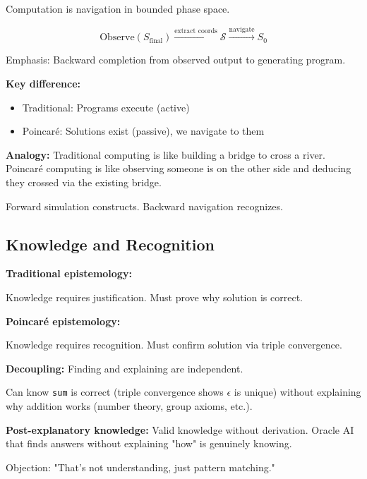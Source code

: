\documentclass[twocolumn,10pt]{article}
\theoremstyle{definition}
\theoremstyle{remark}
\newcommand{\Sspace}{\mathcal{S}}
\begin{document}
Computation is navigation in bounded phase space.

\begin{equation}
\text{Observe}(S_{\text{final}}) \xrightarrow{\text{extract coords}} \Sspace \xrightarrow{\text{navigate}} S_0
\end{equation}

Emphasis: Backward completion from observed output to generating program.

\vspace{0.2cm}
\noindent\textbf{Key difference:}
\begin{itemize}
\item Traditional: Programs execute (active)
\item Poincaré: Solutions exist (passive), we navigate to them
\end{itemize}

\textbf{Analogy:} Traditional computing is like building a bridge to cross a river. Poincaré computing is like observing someone is on the other side and deducing they crossed via the existing bridge.

Forward simulation constructs. Backward navigation recognizes.

\subsection{Knowledge and Recognition}

\textbf{Traditional epistemology\cite{quine1951}:}

Knowledge requires justification. Must prove why solution is correct.

\vspace{0.2cm}
\noindent\textbf{Poincaré epistemology:}

Knowledge requires recognition. Must confirm solution via triple convergence.

\vspace{0.2cm}
\noindent\textbf{Decoupling:} Finding and explaining are independent.

Can know \texttt{sum} is correct (triple convergence shows $\epsilon$ is unique) without explaining why addition works (number theory, group axioms, etc.).

\vspace{0.2cm}
\noindent\textbf{Post-explanatory knowledge:} Valid knowledge without derivation. Oracle AI that finds answers without explaining "how" is genuinely knowing.

Objection: "That's not understanding, just pattern matching."
\end{document}
